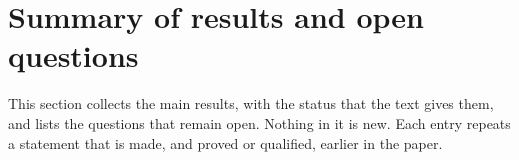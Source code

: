 \documentclass[12pt,letterpaper]{article}
\numberwithin{equation}{section}
\theoremstyle{plain}
\theoremstyle{remark}
\theoremstyle{plain}
\theoremstyle{definition}
\theoremstyle{remark}
\newcounter{rtw}
\theoremstyle{remark}
\begin{document}
\addtocounter{rtw}{1}

\section{Summary of results and open questions}\label{sec:8}

This section collects the main results, with the status that the text gives them, and lists the questions that remain open. Nothing in it is new. Each entry repeats a statement that is made, and proved or qualified, earlier in the paper.
\end{document}
